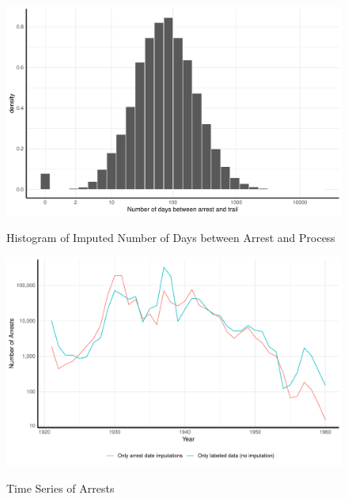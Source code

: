 \begin{figure}[H]
\centering
\caption{Histogram of Imputed Number of Days between Arrest and Process}
\includegraphics[width=1\textwidth]{plots/imputing_arrest_date/mixed_model_preds_hist.pdf}
\label{fig:mixed_model_preds_hist}
\end{figure}
\begin{figure}[H]
\caption{Time Series of Arrests }
\centering
\includegraphics[width=\textwidth]{plots/arrests/date_imputation_line.pdf}
\label{fig:date_imputation_line}
\end{figure}


